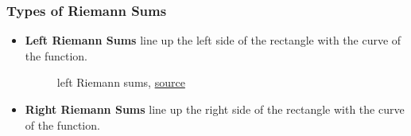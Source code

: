 \documentclass[12pt]{article}
\begin{document}
            \subsubsection{Types of Riemann Sums}
                \begin{itemize}
                    \item \textbf{Left Riemann Sums} line up the left side of the rectangle with the curve of the function.
                    \begin{figure}[H]
                        \begin{center}
                            \caption{left Riemann sums, \href{https://www.khanacademy.org/math/ap-calculus-bc/bc-integration-new/bc-6-2/a/riemann-sums-review?modal=1}{source}}
                        \end{center}
                    \end{figure}
                    \item \textbf{Right Riemann Sums} line up the right side of the rectangle with the curve of the function.
                    \begin{figure}[H]
                        \begin{center}

\end{center}
\end{figure}
\end{itemize}
\end{document}

